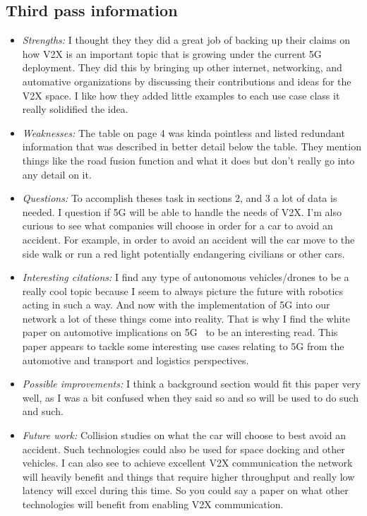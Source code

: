 \documentclass[letterpaper,twocolumn,10pt]{article}
\begin{document}
\subsection{Third pass information}
\label{sec:third}
\begin{itemize}

\item {\it Strengths:} 
I thought they they did a great job of backing up their claims on how V2X is an important topic that is growing under
the current 5G deployment. They did this by bringing up other internet, networking, and automative organizations by
discussing their contributions and ideas for the V2X space. I like how they added little examples to each use case class
it really solidified the idea. 

\item {\it Weaknesses:}
The table on page 4 was kinda pointless and listed redundant information that was described in better detail below the 
table. They mention things like the road fusion function and what it does but don't really go into any detail on it.

\item {\it Questions:} 
To accomplish theses task in sections 2, and 3 a lot of data is needed. I question if 5G will be able to handle the needs
of V2X. I'm also curious to see what companies will choose in order for a car to avoid an accident. For example, in order
to avoid an accident will the car move to the side walk or run a red light potentially endangering civilians or other cars. 

\item {\it Interesting citations:}
I find any type of autonomous vehicles/drones to be a really cool topic because I seem to always picture the future with 
robotics acting in such a way. And now with the implementation of 5G into our network a lot of these things come into 
reality. That is why I find the white paper on automotive implications on 5G~\cite{perspectiveson} to be an interesting read. 
This paper appears to tackle some interesting use cases relating to 5G from the automotive and transport and logistics 
perspectives. 

\item {\it Possible improvements:} 
I think a background section would fit this paper very well, as I was a bit confused when they said so and so will be used
to do such and such. 

\item {\it Future work:} 
Collision studies on what the car will choose to best avoid an accident. Such technologies could also be used for 
space docking and other vehicles. I can also see to achieve excellent V2X communication the network will heavily 
benefit and things that require higher throughput and really low latency will excel during this time. So you could say 
a paper on what other technologies will benefit from enabling V2X communication. 

\end{itemize}

{
  \small 
  
  
}
\end{document}
